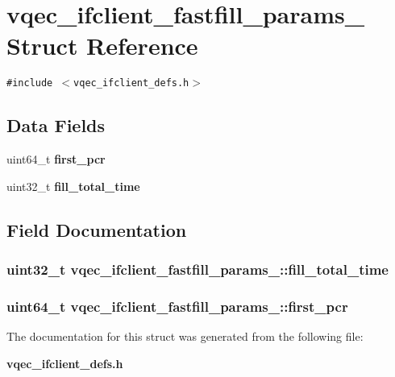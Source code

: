 \section{vqec\_\-ifclient\_\-fastfill\_\-params\_\- Struct Reference}
\label{structvqec__ifclient__fastfill__params__}
{\tt \#include $<$vqec\_\-ifclient\_\-defs.h$>$}

\subsection*{Data Fields}
\begin{CompactItemize}
\item 
uint64\_\-t \bf{first\_\-pcr}
\item 
uint32\_\-t \bf{fill\_\-total\_\-time}
\end{CompactItemize}


\subsection{Field Documentation}
\subsubsection{\setlength{\rightskip}{0pt plus 5cm}uint32\_\-t \bf{vqec\_\-ifclient\_\-fastfill\_\-params\_\-::fill\_\-total\_\-time}}\label{structvqec__ifclient__fastfill__params___0432293bb51649855326663f2600f16a}


\subsubsection{\setlength{\rightskip}{0pt plus 5cm}uint64\_\-t \bf{vqec\_\-ifclient\_\-fastfill\_\-params\_\-::first\_\-pcr}}\label{structvqec__ifclient__fastfill__params___1169f8c7370a68675170636ae645ac1a}




The documentation for this struct was generated from the following file:\begin{CompactItemize}
\item 
\bf{vqec\_\-ifclient\_\-defs.h}\end{CompactItemize}
